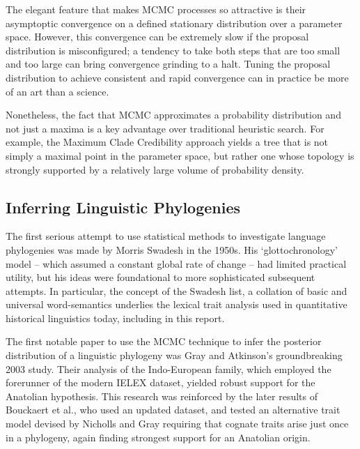 \documentclass[10pt,journal,compsoc]{IEEEtran}
\begin{document}
The elegant feature that makes MCMC processes so attractive is their asymptoptic convergence on a defined stationary distribution over a parameter space. However, this convergence can be extremely slow if the proposal distribution is misconfigured; a tendency to take both steps that are too small and too large can bring convergence grinding to a halt. Tuning the proposal distribution to achieve consistent and rapid convergence can in practice be more of an art than a science.

Nonetheless, the fact that MCMC approximates a probability distribution and not just a maxima is a key advantage over traditional heuristic search. For example, the Maximum Clade Credibility approach yields a tree that is not simply a maximal point in the parameter space, but rather one whose topology is strongly supported by a relatively large volume of probability density.

\subsection{Inferring Linguistic Phylogenies}

The first serious attempt to use statistical methods to investigate language phylogenies was made by Morris Swadesh in the 1950s. His `glottochronology' model -- which assumed a constant global rate of change -- had limited practical utility, but his ideas were foundational to more sophisticated subsequent attempts.\cite{swadesh1955towards} In particular, the concept of the Swadesh list, a collation of basic and universal word-semantics underlies the lexical trait analysis used in quantitative historical linguistics today, including in this report.

The first notable paper to use the MCMC technique to infer the posterior distribution of a linguistic phylogeny was Gray and Atkinson's groundbreaking 2003 study. Their analysis of the Indo-European family, which employed the forerunner of the modern IELEX dataset, yielded robust support for the Anatolian hypothesis.\cite{gray2003language} This research was reinforced by the later results of Bouckaert et al.\cite{bouckaert2012mapping}\cite{bouckaert2013correction}, who used an updated dataset, and tested an alternative trait model devised by Nicholls and Gray\cite{nicholls2008dated} requiring that cognate traits arise just once in a phylogeny, again finding strongest support for an Anatolian origin.
\end{document}
